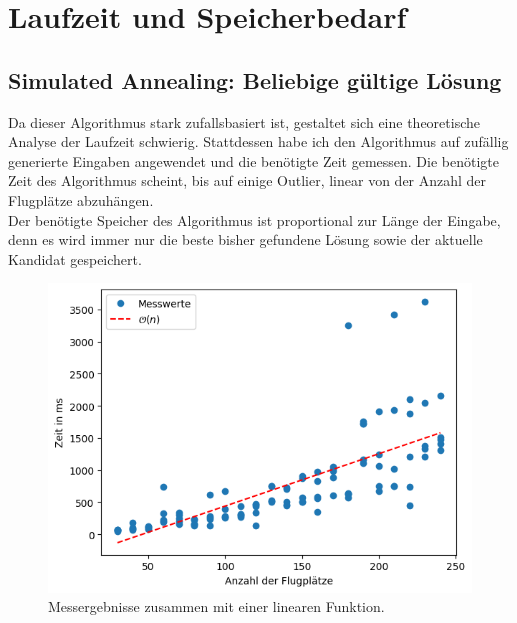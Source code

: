 \documentclass[a4paper,10pt,ngerman]{scrartcl}
\begin{document}
\section{Laufzeit und Speicherbedarf}
\subsection{Simulated Annealing: Beliebige gültige Lösung}
Da dieser Algorithmus stark zufallsbasiert ist, gestaltet sich eine theoretische Analyse der Laufzeit schwierig. Stattdessen habe ich den Algorithmus auf
zufällig generierte Eingaben angewendet und die benötigte Zeit gemessen. Die benötigte Zeit des Algorithmus scheint, bis auf einige Outlier, linear von der
Anzahl der Flugplätze abzuhängen. \\
Der benötigte Speicher des Algorithmus ist proportional zur Länge der Eingabe, denn es wird immer nur die beste bisher gefundene Lösung sowie der aktuelle Kandidat
gespeichert.
\begin{figure}[t]
  \includegraphics[scale=.5]{feasibletrend.png}
  \centering
  \caption{Messergebnisse zusammen mit einer linearen Funktion.}
\end{figure}
\end{document}
